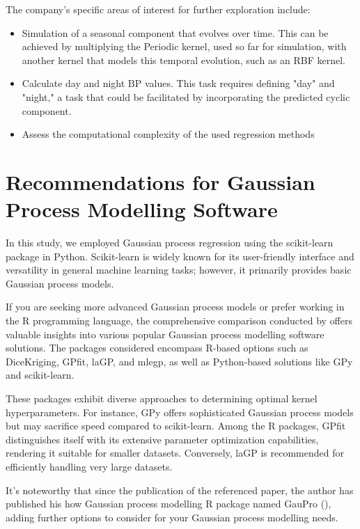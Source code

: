 The company's specific areas of interest for further exploration include:

\begin{itemize}
    \item Simulation of a seasonal component that evolves over time.
    This can be achieved by multiplying the Periodic kernel, used so far for simulation,
    with another kernel that models this temporal evolution, such as an RBF kernel.

    \item Calculate day and night BP values. This task requires defining "day" and "night," a task that could be
    facilitated by incorporating the predicted cyclic component.

    \item Assess the computational complexity of the used regression methods

\end{itemize}


\section{Recommendations for Gaussian Process Modelling Software}

In this study, we employed Gaussian process regression using the scikit-learn
package in Python. Scikit-learn is widely known for its user-friendly interface
and versatility in general machine learning tasks; however,
it primarily provides basic Gaussian process models.

If you are seeking more advanced Gaussian process models or prefer working
in the R programming language,
the comprehensive comparison conducted by \citeauthor{erickson_comparison_2018}
offers valuable insights into various popular Gaussian process modelling software solutions.
The packages considered encompass R-based options such as DiceKriging, GPfit, laGP, and mlegp,
as well as Python-based solutions like GPy and scikit-learn.

These packages exhibit diverse approaches to determining optimal kernel hyperparameters.
For instance, GPy offers sophisticated Gaussian process models but may sacrifice speed compared to scikit-learn.
Among the R packages, GPfit distinguishes itself with its extensive parameter optimization capabilities,
rendering it suitable for smaller datasets.
Conversely, laGP is recommended for efficiently handling very large datasets.

It's noteworthy that since the publication of the referenced paper,
the author has published his how Gaussian process modelling R package named
GauPro (\citeauthor{erickson_gaupro_2023}),
adding further options to consider for your Gaussian process modelling needs.
